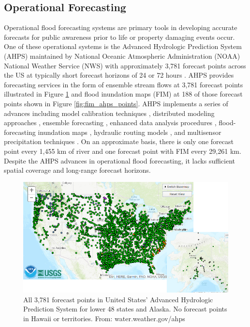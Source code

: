 \subsection{Operational Forecasting}
%
Operational flood forecasting systems are primary tools in developing accurate forecasts for public awareness prior to life or property damaging events occur. 
One of these operational systems is the Advanced Hydrologic Prediction System (AHPS) maintained by National Oceanic Atmospheric Administration (NOAA) National Weather Service (NWS) with approximately 3,781 forecast points across the US at typically short forecast horizons of 24 or 72 hours \cite{mcenery2005noaa}.
AHPS provides forecasting services in the form of ensemble stream flows at 3,781 forecast points illustrated in Figure \ref{fig:all_ahps_points} and flood inundation maps (FIM) at 188 of those forecast points shown in Figure \ref{fig:fim_ahps_points}.
AHPS implements a series of advances including model calibration techniques \cite{zhang2003hydrologic,hogue2003multi,duan2003global,gupta2003advances,parada2003multi}, distributed modeling approaches \cite{reed2004overall,koren2004hydrology,duan2002results}, ensemble forecasting \cite{day1985extended,seo2000simulation,mullusky2002simplified,herr2002simplified}, enhanced data analysis procedures \cite{mcenery2005noaa}, flood-forecasting inundation maps \cite{cajina2002fldview}, hydraulic routing models \cite{fread1973technique,cajina2002fldview}, and multisensor precipitation techniques \cite{breidenbach1999accounting,kondragunta2001outlier,seo2002real,bonnin1996noaa}.
On an approximate basis, there is only one forecast point every 1,455 km of river and one forecast point with FIM every 29,261 km.
Despite the AHPS advances in operational flood forecasting, it lacks sufficient spatial coverage and long-range forecast horizons.
%
\begin{figure}[h!]
\centering
\includegraphics[scale=2.0]{figures/ahps_all_forecast_points.jpg}
\caption{All 3,781 forecast points in United States' Advanced Hydrologic Prediction System for lower 48 states and Alaska. No forecast points in Hawaii or territories. From: water.weather.gov/ahps}
\label{fig:all_ahps_points}
\end{figure}
